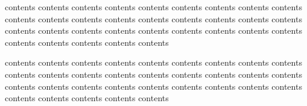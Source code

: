 contents contents contents contents contents contents contents contents
contents contents contents contents contents contents contents contents
contents contents contents contents contents contents contents contents
contents contents contents contents contents contents contents contents

contents contents contents contents contents contents contents contents
contents contents contents contents contents contents contents contents
contents contents contents contents contents contents contents contents
contents contents contents contents contents contents contents contents